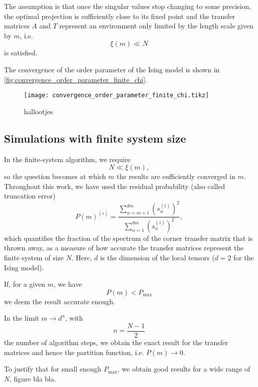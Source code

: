 The assumption is that once the singular values stop changing to some precision, the optimal projection is sufficiently
close to its fixed point and the transfer matrices $A$ and $T$ represent an environment only limited by the length scale
given by $m$, i.e.
\begin{equation}
  \xi(m) \ll N
\end{equation}
is satisfied.

The convergence of the order parameter of the Ising model is shown in
\autoref{fig:convergence_order_parameter_finite_chi}.


\begin{figure}
  \texttt{[image: convergence\_order\_parameter\_finite\_chi.tikz]}
  \caption{hallootjes}\label{fig:convergence_order_parameter_finite_chi}
\end{figure}


\subsection{Simulations with finite system size}
In the finite-system algorithm, we require
\begin{equation}
  N \ll \xi(m),
\end{equation}
so the question becomes at which $m$ the results are sufficiently converged in $m$. Throughout this work, we have used
the residual probability (also called truncation error)
\begin{equation}
  P(m)^{(i)} = \frac{\sum_{\alpha = m + 1}^{dm} (s_{\alpha}^{(i)})^2 }{ \sum_{\alpha = 1}^{dm} (s_{\alpha}^{(i)})^2 },
\end{equation}
which quantifies the fraction of the spectrum of the corner transfer matrix that is thrown away, as a measure of how
accurate the transfer matrices represent the finite system of size $N$. Here, $d$ is the
dimension of the local tensors ($d = 2$ for the Ising model).

If, for a given $m$, we have
\begin{equation}
  P(m) < P_{\text{max}}
\end{equation}
we deem the result accurate enough.

In the limit $m \to d^n$, with
\begin{equation}
  n = \frac{N - 1}{2}
\end{equation}
the number of algorithm steps, we obtain the exact result for the transfer matrices and hence the partition function,
i.e. $P(m) \to 0$.

To justify that for small enough $P_{\max}$, we obtain good results for a wide range of $N$, figure bla bla.
